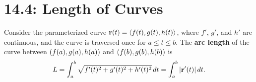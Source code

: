 \documentclass[mathNotesPreamble]{subfiles}
\begin{document}
\section{14.4: Length of Curves}
  \begin{defn*}
    Consider the parameterized curve ${\mathbf{r}}(t)={\left\langle f(t),g(t),h(t) \right\rangle}$, where $f'$, $g'$, and $h'$ are continuous, and the curve is traversed once for $a\leq t\leq b$. The \textbf{arc length} of the curve between ${\left(f(a), g(a), h(a)\right)}$ and ${\left(f(b), g(b), h(b)\right)}$ is
    \[L=\int_a^b \sqrt{f'(t)^2+g'(t)^2+h'(t)^2}\,dt=\int_a^b{\left\vert{\mathbf{r}}'(t)\right\vert}\,dt.\]
  \end{defn*}
  
  \noindent
  \pagebreak
  
\end{document}
